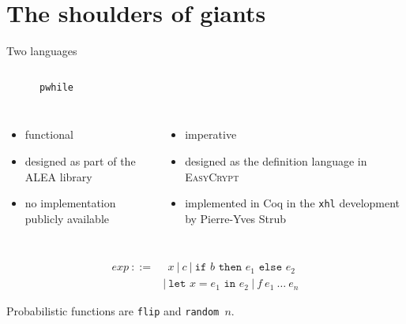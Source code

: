 \documentclass{beamer}
\begin{document}
\section{The shoulders of giants}


\begin{frame}{Two languages}
  \begin{columns}
    \LARGE{\rml}\tiny{\cite{rml-paper}}
    \hrule
    \LARGE{\texttt{pwhile}}\tiny{\cite{easy-crypt}}
    \vspace{-0.5em}
    \hrule
  \end{columns}
  \pause
  \begin{columns}
    \begin{itemize}
        \item functional
        \item designed as part of the ALEA library
        \item no implementation publicly available
    \end{itemize}
    \pause
    \begin{itemize}
        \item imperative
        \item designed as the definition language in \textsc{EasyCrypt}
        \item implemented in Coq in the \texttt{xhl} development by Pierre-Yves
      Strub
    \end{itemize}
  \end{columns}
\end{frame}


\begin{frame}{\rml}
  
\begin{align*}
  exp~::=&~ ~ x~\vert ~ c~\vert ~ \texttt{if }b\texttt{ then }e_1\texttt{ else } e_2~\\
  &\vert ~ \texttt{let }x = e_1 \texttt{ in }e_2~\vert ~ f~e_1~\dots~e_n
\end{align*}

Probabilistic functions are \texttt{flip} and \texttt{random $n$}. 
\end{frame}

\end{document}
